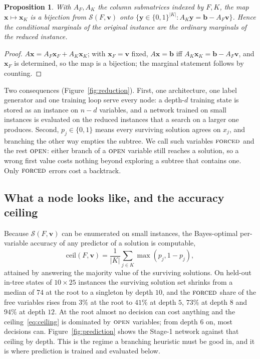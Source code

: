 \documentclass[final,5p,times,twocolumn,authoryear]{elsarticle}
\newtheorem{proposition}{Proposition}
\newcommand{\SOL}{\mathcal{S}}
\newcommand{\FORCED}{\textsc{forced}}
\newcommand{\FREE}{\textsc{open}}
\begin{document}
\begin{proposition}
\label{prop:reduce}
With $A_F,A_K$ the column submatrices indexed by $F,K$, the map $\mathbf{x}\mapsto\mathbf{x}_K$ is a bijection from $\SOL(F,\mathbf{v})$ onto $\{\mathbf{y}\in\{0,1\}^{|K|}:A_K\mathbf{y}=\mathbf{b}-A_F\mathbf{v}\}$. Hence the conditional marginals of the original instance are the ordinary marginals of the reduced instance.
\end{proposition}
\begin{proof}
$A\mathbf{x}=A_F\mathbf{x}_F+A_K\mathbf{x}_K$; with $\mathbf{x}_F=\mathbf{v}$ fixed, $A\mathbf{x}=\mathbf{b}$ iff $A_K\mathbf{x}_K=\mathbf{b}-A_F\mathbf{v}$, and $\mathbf{x}_F$ is determined, so the map is a bijection; the marginal statement follows by counting.
\end{proof}

Two consequences (Figure~\ref{fig:reduction}). First, one architecture, one label generator and one training loop serve every node: a depth-$d$ training state is stored as an instance on $n-d$ variables, and a network trained on small instances is evaluated on the reduced instances that a search on a larger one produces. Second, $p_j\in\{0,1\}$ means every surviving solution agrees on $x_j$, and branching the other way empties the subtree. We call such variables $\FORCED$ and the rest $\FREE$: either branch of a $\FREE$ variable still reaches a solution, so a wrong first value costs nothing beyond exploring a subtree that contains one. Only $\FORCED$ errors cost a backtrack.

\subsection{What a node looks like, and the accuracy ceiling}
\label{sec:problem-ceiling}

Because $\SOL(F,\mathbf{v})$ can be enumerated on small instances, the Bayes-optimal per-variable accuracy of any predictor of a solution is computable,
\begin{equation}
\mathrm{ceil}(F,\mathbf{v})=\frac{1}{|K|}\sum_{j\in K}\max(p_j,1-p_j),
\label{eq:ceiling}
\end{equation}
attained by answering the majority value of the surviving solutions. On held-out in-tree states of $10\times25$ instances the surviving solution set shrinks from a median of $74$ at the root to a singleton by depth $10$, and the $\FORCED$ share of the free variables rises from $3\%$ at the root to $41\%$ at depth $5$, $73\%$ at depth $8$ and $94\%$ at depth $12$. At the root almost no decision can cost anything and the ceiling~\eqref{eq:ceiling} is dominated by $\FREE$ variables; from depth $6$ on, most decisions can. Figure~\ref{fig:prediction} shows the Stage-1 network against that ceiling by depth. This is the regime a branching heuristic must be good in, and it is where prediction is trained and evaluated below.
\end{document}

